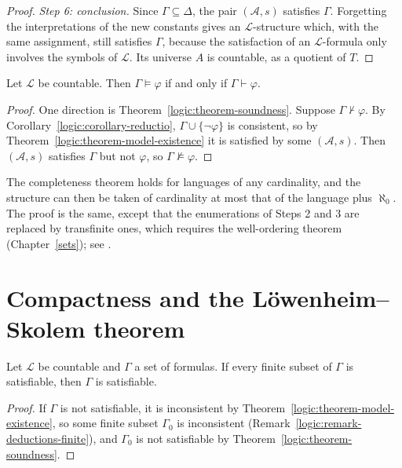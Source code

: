 \begin{proof}
\emph{Step 6: conclusion.} Since $\Gamma \subseteq \Delta$, the pair
$(\mathcal{A}, s)$ satisfies $\Gamma$. Forgetting the interpretations of the
new constants gives an $\mathcal{L}$-structure which, with the same assignment,
still satisfies $\Gamma$, because the satisfaction of an $\mathcal{L}$-formula
only involves the symbols of $\mathcal{L}$. Its universe $A$ is countable, as a
quotient of $T$.
\end{proof}

\begin{corollary}\label{logic:corollary-completeness}
Let $\mathcal{L}$ be countable. Then $\Gamma \models \varphi$ if and only if
$\Gamma \vdash \varphi$.
\end{corollary}

\begin{proof}
One direction is Theorem~\ref{logic:theorem-soundness}. Suppose
$\Gamma \not\vdash \varphi$. By Corollary~\ref{logic:corollary-reductio},
$\Gamma \cup \{\neg\varphi\}$ is consistent, so by
Theorem~\ref{logic:theorem-model-existence} it is satisfied by some
$(\mathcal{A}, s)$. Then $(\mathcal{A}, s)$ satisfies $\Gamma$ but not
$\varphi$, so $\Gamma \not\models \varphi$.
\end{proof}

\begin{remark}\label{logic:remark-uncountable-languages}
The completeness theorem holds for languages of any cardinality, and the
structure can then be taken of cardinality at most that of the language plus
$\aleph_0$. The proof is the same, except that the enumerations of Steps 2 and
3 are replaced by transfinite ones, which requires the well-ordering theorem
(Chapter~\ref{sets}); see \cite[Section 2.2]{chang-keisler}.
\end{remark}

\section{Compactness and the L\"owenheim--Skolem theorem}\label{logic:section-compactness}

\begin{theorem}\label{logic:theorem-compactness}
Let $\mathcal{L}$ be countable and $\Gamma$ a set of formulas. If every finite
subset of $\Gamma$ is satisfiable, then $\Gamma$ is satisfiable.
\end{theorem}

\begin{proof}
If $\Gamma$ is not satisfiable, it is inconsistent by
Theorem~\ref{logic:theorem-model-existence}, so some finite subset
$\Gamma_0$ is inconsistent (Remark~\ref{logic:remark-deductions-finite}), and
$\Gamma_0$ is not satisfiable by Theorem~\ref{logic:theorem-soundness}.
\end{proof}

